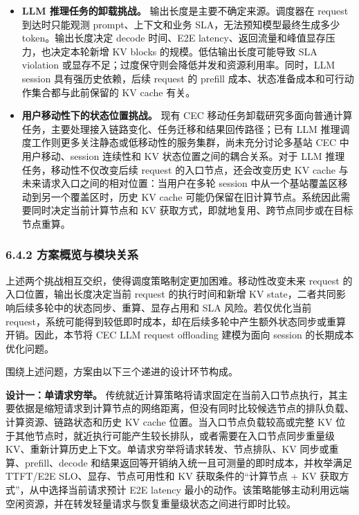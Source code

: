 \begin{itemize}
    \item \textbf{LLM 推理任务的卸载挑战。} 输出长度是主要不确定来源。调度器在 request 到达时只能观测 prompt、上下文和业务 SLA，无法预知模型最终生成多少 token。输出长度决定 decode 时间、E2E latency、返回流量和峰值显存压力，也决定本轮新增 KV blocks 的规模。低估输出长度可能导致 SLA violation 或显存不足；过度保守则会降低并发和资源利用率。同时，LLM session 具有强历史依赖，后续 request 的 prefill 成本、状态准备成本和可行动作集合都与此前保留的 KV cache 有关。
    \item \textbf{用户移动性下的状态位置挑战。} 现有 CEC 移动任务卸载研究多面向普通计算任务，主要处理接入链路变化、任务迁移和结果回传路径；已有 LLM 推理调度工作则更多关注静态或低移动性的服务集群，尚未充分讨论多基站 CEC 中用户移动、session 连续性和 KV 状态位置之间的耦合关系。对于 LLM 推理任务，移动性不仅改变后续 request 的入口节点，还会改变历史 KV cache 与未来请求入口之间的相对位置：当用户在多轮 session 中从一个基站覆盖区移动到另一个覆盖区时，历史 KV cache 可能仍保留在旧计算节点。系统因此需要同时决定当前计算节点和 KV 获取方式，即就地复用、跨节点同步或在目标节点重算。
\end{itemize}

\subsubsection*{6.4.2 方案概览与模块关系}

上述两个挑战相互交织，使得调度策略制定更加困难。移动性改变未来 request 的入口位置，输出长度决定当前 request 的执行时间和新增 KV state，二者共同影响后续多轮中的状态同步、重算、显存占用和 SLA 风险。若仅优化当前 request，系统可能得到较低即时成本，却在后续多轮中产生额外状态同步或重算开销。因此，本节将 CEC LLM request offloading 建模为面向 session 的长期成本优化问题。

围绕上述问题，方案由以下三个递进的设计环节构成。

\noindent\textbf{设计一：单请求穷举。}
传统就近计算策略将请求固定在当前入口节点执行，其主要依据是缩短请求到计算节点的网络距离，但没有同时比较候选节点的排队负载、计算资源、链路状态和历史 KV cache 位置。当入口节点负载较高或完整 KV 位于其他节点时，就近执行可能产生较长排队，或者需要在入口节点同步重量级 KV、重新计算历史上下文。单请求穷举将请求转发、节点排队、KV 同步或重算、prefill、decode 和结果返回等开销纳入统一且可测量的即时成本，并枚举满足 TTFT/E2E SLO、显存、节点可用性和 KV 获取条件的“计算节点 + KV 获取方式”，从中选择当前请求预计 E2E latency 最小的动作。该策略能够主动利用远端空闲资源，并在转发轻量请求与恢复重量级状态之间进行即时比较。


